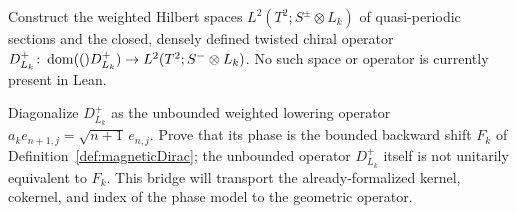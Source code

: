 \begin{definition}
  \label{def:line-bundle-dirac-L2}
  Construct the weighted Hilbert spaces $L^2(T^2;S^\pm\otimes L_k)$ of quasi-periodic
  sections and the closed, densely defined twisted chiral operator
  $D^+_{L_k}\colon\operatorname{dom}(()D^+_{L_k})\to L^2(T^2;S^-\otimes L_k)$.  No such space or operator is
  currently present in Lean.
\end{definition}

\begin{theorem}
  \label{thm:weighted-landau-lowering}
  Diagonalize $D^+_{L_k}$ as the unbounded weighted lowering operator
  $a_ke_{n+1,j}=\sqrt{n+1}\,e_{n,j}$.  Prove that its phase is the bounded backward shift
  $F_k$ of Definition~\ref{def:magneticDirac}; the unbounded operator $D^+_{L_k}$ itself is not
  unitarily equivalent to $F_k$.  This bridge will transport the already-formalized kernel,
  cokernel, and index of the phase model to the geometric operator.
\end{theorem}
